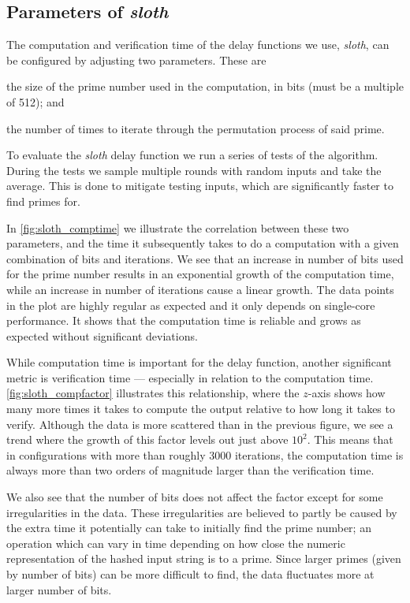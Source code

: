 \subsection{Parameters of \textit{sloth}}%
\label{sub:sloth_parameters}

The computation and verification time of the delay functions we use, \textit{sloth}, can be configured by adjusting two parameters.
These are
\begin{eletterate*}
\item the size of the prime number used in the computation, in bits (must be a multiple of 512); and
\item the number of times to iterate through the permutation process of said prime.
\end{eletterate*}

To evaluate the \textit{sloth} delay function we run a series of tests of the algorithm.
During the tests we sample multiple rounds with random inputs and take the average.
This is done to mitigate testing inputs, which are significantly faster to find primes for.

In \vref{fig:sloth_comptime} we illustrate the correlation between these two parameters, and the time it subsequently takes to do a computation with a given combination of bits and iterations.
We see that an increase in number of bits used for the prime number results in an exponential growth of the computation time, while an increase in number of iterations cause a linear growth.
The data points in the plot are highly regular as expected and it only depends on single-core performance. It shows that the computation time is reliable and grows as expected without significant deviations.

While computation time is important for the delay function, another significant metric is verification time --- especially in relation to the computation time.
\vref{fig:sloth_compfactor} illustrates this relationship, where the $z$-axis shows how many more times it takes to compute the output relative to how long it takes to verify.
Although the data is more scattered than in the previous figure, we see a trend where the growth of this factor levels out just above $10^2$.
This means that in configurations with more than roughly 3000 iterations, the computation time is always more than two orders of magnitude larger than the verification time.

We also see that the number of bits does not affect the factor except for some irregularities in the data.
These irregularities are believed to partly be caused by the extra time it potentially can take to initially find the prime number; an operation which can vary in time depending on how close the numeric representation of the hashed input string is to a prime.
Since larger primes (given by number of bits) can be more difficult to find, the data fluctuates more at larger number of bits.


